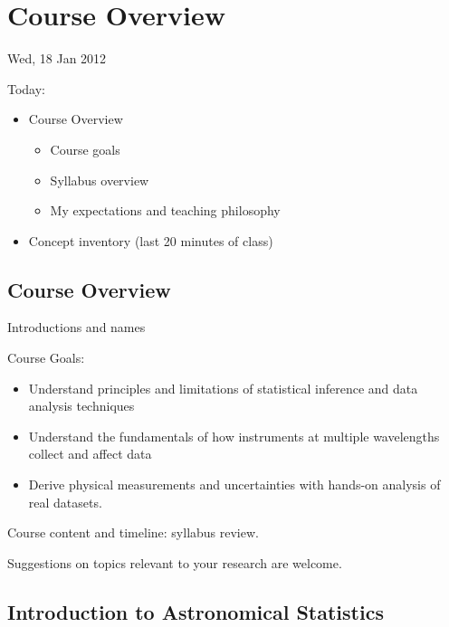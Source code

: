 \documentclass[12pt]{report}
\begin{document}
\setcounter{chapter}{0}

\chapter{Course Overview}


Wed, 18 Jan 2012


Today:
\begin{itemize}
\item Course Overview
  \begin{itemize}
  \item Course goals
    
  \item Syllabus overview
    
  \item My expectations and teaching philosophy
  \end{itemize}
\item Concept inventory (last 20 minutes of class)

\end{itemize}

\section{Course Overview}

Introductions and names

Course Goals:
\begin{itemize}
\item Understand principles and limitations of statistical inference and
  data analysis techniques

\item Understand the fundamentals of how instruments at multiple wavelengths
  collect and affect data
  
\item Derive physical measurements and uncertainties with hands-on analysis
  of real datasets. 
\end{itemize}

Course content and timeline: syllabus review.

Suggestions on topics relevant to your research are welcome.

\section{Introduction to Astronomical Statistics}
\end{document}
